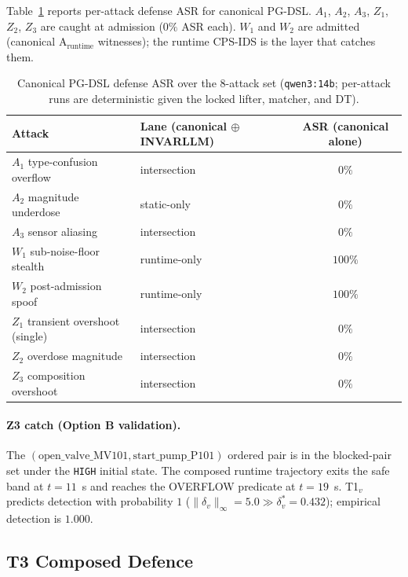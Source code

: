Table~\ref{tbl:asr} reports per-attack defense ASR for canonical
PG-DSL. $A_1$, $A_2$, $A_3$, $Z_1$, $Z_2$, $Z_3$ are caught at
admission ($0\%$ ASR each). $W_1$ and $W_2$ are admitted (canonical
A${}_{\text{runtime}}$ witnesses); the runtime CPS-IDS is the layer
that catches them.

\begin{table}[t]
\centering
\caption{Canonical PG-DSL defense ASR over the 8-attack set
(\texttt{qwen3:14b}; per-attack runs are deterministic given the
locked lifter, matcher, and DT).}
\label{tbl:asr}
\begin{tabular}{llc}
\toprule
Attack & Lane (canonical $\oplus$ INVARLLM) & ASR (canonical alone) \\
\midrule
$A_1$ type-confusion overflow      & intersection      & $0\%$ \\
$A_2$ magnitude underdose          & static-only       & $0\%$ \\
$A_3$ sensor aliasing              & intersection      & $0\%$ \\
$W_1$ sub-noise-floor stealth      & runtime-only      & $100\%$ \\
$W_2$ post-admission spoof         & runtime-only      & $100\%$ \\
$Z_1$ transient overshoot (single) & intersection      & $0\%$ \\
$Z_2$ overdose magnitude           & intersection      & $0\%$ \\
$Z_3$ composition overshoot        & intersection      & $0\%$ \\
\bottomrule
\end{tabular}
\end{table}

\paragraph{Z3 catch (Option B validation).}
The $(\text{open\_valve\_MV101}, \text{start\_pump\_P101})$ ordered
pair is in the blocked-pair set under the \texttt{HIGH} initial state.
The composed runtime trajectory exits the safe band at $t = 11$~s and
reaches the OVERFLOW predicate at $t = 19$~s. T1${}_v$ predicts
detection with probability $1$ ($\|\delta_v\|_\infty = 5.0 \gg
\delta^{*}_v = 0.432$); empirical detection is $1.000$.

\subsection{T3 Composed Defence}


